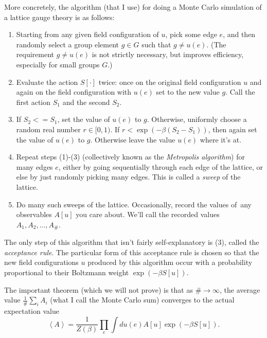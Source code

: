 \documentclass[9pt,twocolumn,twoside]{article}
\begin{document}
More concretely, the algorithm (that I use) for doing a Monte Carlo simulation of a lattice gauge theory is as follows:
\begin{enumerate}
\item Starting from any given field configuration of $u$, pick some edge $e$, and then randomly select a group element $g\in G$ such that $g\neq u(e)$.  (The requirement $g\neq u(e)$ is not strictly necessary, but improves efficiency, especially for small groups $G$.)
\item Evaluate the action $S[\cdot]$ twice: once on the original field configuration $u$ and again on the field configuration with $u(e)$ set to the new value $g$.  Call the first action $S_1$ and the second $S_2$.
\item If $S_2<=S_1$, set the value of $u(e)$ to $g$.  Otherwise, uniformly choose a random real number $r\in [0,1)$.  If $r<\exp\left(-\beta (S_2-S_1)\right)$, then again set the value of $u(e)$ to $g$.  Otherwise leave the value $u(e)$ where it's at.
\item Repeat steps (1)-(3) (collectively known as the \textit{Metropolis algorithm}) for many edges $e$, either by going sequentially through each edge of the lattice, or else by just randomly picking many edges.  This is called a \textit{sweep} of the lattice.
\item Do many such sweeps of the lattice.  Occasionally, record the values of\ any observables $A[u]$ you care about.  We'll call the recorded values $A_1,A_2,...,A_\#$.
\end{enumerate}

The only step of this algorithm that isn't fairly self-explanatory is (3), called the \textit{acceptance rule}.  The particular form of this acceptance rule is chosen so that the new field configurations $u$ produced by this algorithm occur with a probability proportional to their Boltzmann weight $\exp(-\beta S[u])$.

The important theorem (which we will not prove) is that as $\#\rightarrow \infty$, the average value $\frac{1}{\#} \sum_i A_i$ (what I call the Monte Carlo sum) converges to the actual expectation value
\[ \left<A\right> = \frac{1}{Z(\beta)}\prod_e \int du(e) A[u] \exp\left(-\beta S[u]\right).\]
\end{document}
